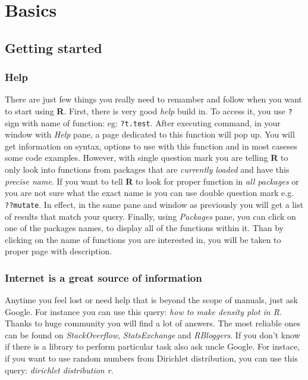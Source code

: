 \documentclass[]{book}
\theoremstyle{definition}
\theoremstyle{definition}
\theoremstyle{definition}
\theoremstyle{remark}
\begin{document}
\chapter{Basics}\label{basics}

\section{Getting started}\label{getting-started}

\subsection{Help}\label{help}

There are just few things you really need to remamber and follow when
you want to start using \textbf{R}. First, there is very good
\emph{help} build in. To access it, you use \texttt{?} sign with name of
function: eg: \texttt{?t.test}. After executing command, in your window
with \emph{Help} pane, a page dedicated to this function will pop up.
You will get information on syntax, options to use with this function
and in most caseses some code examples. However, with single question
mark you are telling \textbf{R} to only look into functions from
packages that are \emph{currently loaded} and have this \emph{precise
name}. If you want to tell \textbf{R} to look for proper function in
\emph{all packages} or you are not sure what the exact name is you can
use double question mark e.g. \texttt{??mutate}. In effect, in the same
pane and window as previously you will get a list of results that match
your query. Finally, using \emph{Packages} pane, you can click on one of
the packages names, to display all of the functions within it. Than by
clicking on the name of functions you are interested in, you will be
taken to proper page with description.

\subsection{Internet is a great source of
information}\label{internet-is-a-great-source-of-information}

Anytime you feel lost or need help that is beyond the scope of manuals,
just ask Google. For instance you can use this query: \emph{how to make
density plot in R}. Thanks to huge community you will find a lot of
answers. The most reliable ones can be found on \emph{StackOverflow},
\emph{StatsExchange} and \emph{RBloggers}. If you don't know if there is
a library to perform particular task also ask uncle Google. For instace,
if you want to use random numbers from Dirichlet distribution, you can
use this query: \emph{dirichlet distribution r}.
\end{document}
